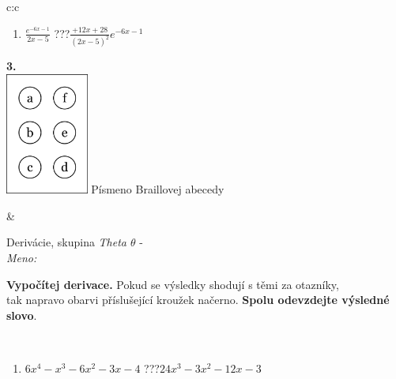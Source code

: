 \documentclass[10pt]{report}
\begin{document}
\begin{tabular}{c:c}
\begin{minipage}[c][104.5mm][t]{0.5\linewidth}
\begin{center}
\begin{minipage}{0.79\linewidth}
\begin{center}
\begin{varwidth}{\linewidth}
\begin{enumerate}
\item $\frac{e^{-6x-1}}{2x-5}$\quad \dotfill\; ???\;\dotfill \quad $\frac{+12x+28}{(2x-5)^2}e^{-6x-1}$
\end{enumerate}
\end{varwidth}
\end{center}
\end{minipage}
\begin{minipage}{0.20\linewidth}
\begin{center}
{\Huge\bfseries 3.} \\[2mm]
\includegraphics[height=40mm]{../images/braille.png}
{\small Písmeno Braillovej abecedy}
\end{center}
\end{minipage}
\end{center}
\end{minipage}
&
\begin{minipage}[c][104.5mm][t]{0.5\linewidth}
\begin{center}
\vspace{7mm}
{\huge Derivácie, skupina \textit{Theta $\theta$} -}\\[5mm]
\textit{Meno:}\phantom{xxxxxxxxxxxxxxxxxxxxxxxxxxxxxxxxxxxxxxxxxxxxxxxxxxxxxxxxxxxxxxxxx}\\[5mm]
\begin{minipage}{0.95\linewidth}
\begin{center}
\textbf{Vypočítej derivace.} Pokud se výsledky shodují s těmi za otazníky,\\tak napravo obarvi příslušející kroužek načerno. \textbf{Spolu odevzdejte výsledné slovo}.
\end{center}
\end{minipage}
\\[1mm]
\begin{minipage}{0.79\linewidth}
\begin{center}
\begin{varwidth}{\linewidth}
\begin{enumerate}
\normalsize
\item $6x^4-x^3-6x^2-3x-4$\quad \dotfill\; ???\;\dotfill \quad $24x^3-3x^2-12x-3$

\end{enumerate}
\end{varwidth}
\end{center}
\end{minipage}
\end{center}
\end{minipage}
\end{tabular}
\end{document}

